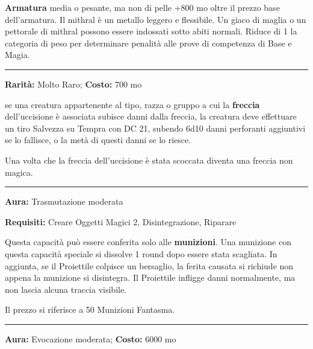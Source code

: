 \begin{multicols}{2}
\textbf{Armatura} media o pesante, ma non di pelle +800 mo oltre il prezzo base dell'armatura. Il mithral è un metallo leggero e flessibile. Un giaco di maglia o un pettorale di mithral possono essere indossati sotto abiti normali. Riduce di 1 la categoria di peso per determinare penalità alle prove di competenza di Base e Magia.

\smallskip\noindent\rule{\linewidth}{2pt}  \hypertarget{Munizionedell'Uccisione}{}\medskip{}\noindent\label{Munizionedell'Uccisione}

\textbf{Rarità:} Molto Raro; \textbf{Costo:} 700 mo

se una creatura appartenente al tipo, razza o gruppo a cui la \textbf{freccia} dell'uccisione è associata subisce danni dalla freccia, la creatura deve effettuare un tiro Salvezza su Tempra con DC 21, subendo 6d10 danni perforanti aggiuntivi se lo fallisce, o la metà di questi danni se lo riesce.

Una volta che la freccia dell'uccisione è stata scoccata diventa una freccia non magica.

\smallskip\noindent\rule{\linewidth}{2pt}  \hypertarget{MunizioneFantasma}{}\medskip{}\noindent\label{MunizioneFantasma}

\textbf{Aura:} Trasmutazione moderata

\textbf{Requisiti:} Creare Oggetti Magici 2, Disintegrazione, Riparare

Questa capacità può essere conferita solo alle \textbf{munizioni}. Una munizione con questa capacità speciale si dissolve 1 round dopo essere stata scagliata. In aggiunta, se il Proiettile colpisce un bersaglio, la ferita causata si richiude non appena la munizione si disintegra. Il Proiettile infligge danni normalmente, ma non lascia alcuna traccia visibile.

Il prezzo si riferisce a 50 Munizioni Fantasma.

\smallskip\noindent\rule{\linewidth}{2pt}  \hypertarget{MunizioniInfinite}{}\medskip{}\noindent\label{MunizioniInfinite}

\textbf{Aura:} Evocazione moderata; \textbf{Costo:} 6000 mo


\end{multicols}
